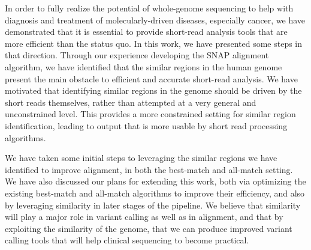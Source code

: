 \documentclass[twocolumn,10pt]{article}
\begin{document}
In order to fully realize the potential of whole-genome sequencing to help with diagnosis and treatment of molecularly-driven diseases, especially cancer, we have demonstrated that it is essential to provide short-read analysis tools that are more efficient than the status quo.  In this work, we have presented some steps in that direction.  Through our experience developing the SNAP alignment algorithm, we have identified that the similar regions in the human genome present the main obstacle to efficient and accurate short-read analysis.  We have motivated that identifying similar regions in the genome should be driven by the short reads themselves, rather than attempted at a very general and unconstrained level.  This provides a more constrained setting for similar region identification, leading to output that is more usable by short read processing algorithms.  

We have taken some initial steps to leveraging the similar regions we have identified to improve alignment, in both the best-match and all-match setting.  We have also discussed our plans for extending this work, both via optimizing the existing best-match and all-match algorithms to improve their efficiency, and also by leveraging similarity in later stages of the pipeline.  We believe that similarity will play a major role in variant calling as well as in alignment, and that by exploiting the similarity of the genome, that we can produce improved variant calling tools that will help clinical sequencing to become practical.

\begin{small}

\end{small}
\end{document}
